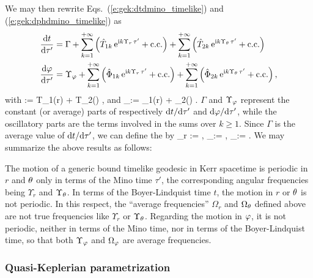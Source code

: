 We may then rewrite Eqs.~(\ref{e:gek:dtdmino_timelike}) and (\ref{e:gek:dphdmino_timelike})
as
\begin{subequations}
\begin{align}
 & \frac{\mathrm{d} t}{\mathrm{d} \tau'} = \Gamma + \sum_{k=1}^{+\infty} \left( \hat{T}_{1k} \, \mathrm{e}^{\mathrm{i} k \Upsilon_r \, \tau'} + \mathrm{c.c.} \right)
    + \sum_{k=1}^{+\infty} \left( \hat{T}_{2k} \, \mathrm{e}^{\mathrm{i} k \Upsilon_\theta \, \tau'} + \mathrm{c.c.} \right) \\
 & \frac{\mathrm{d} \varphi}{\mathrm{d} \tau'} = \Upsilon_\varphi + \sum_{k=1}^{+\infty} \left( \hat{\Phi}_{1k} \, \mathrm{e}^{\mathrm{i} k \Upsilon_r \, \tau'} + \mathrm{c.c.} \right)
 + \sum_{k=1}^{+\infty} \left( \hat{\Phi}_{2k} \, \mathrm{e}^{\mathrm{i} k \Upsilon_\theta \, \tau'} + \mathrm{c.c.} \right) ,
\end{align}
\end{subequations}
with
\be
    \Gamma := \langle T_1(r) \rangle + \langle T_2(\th) \rangle ,
\ee
and
\be
    \Upsilon_\ph :=  \langle \Phi_1(r) \rangle + \langle \Phi_2(\th) \rangle .
\ee
$\Gamma$ and $\Upsilon_\varphi$ represent the constant (or average) parts of
respectively $\mathrm{d} t/\mathrm{d}\tau'$ and $\mathrm{d} \varphi / \mathrm{d}\tau'$, while the oscillatory parts
are the terms involved in the sums over $k\geq 1$.
Since $\Gamma$ is the average value of $\mathrm{d} t/\mathrm{d}\tau'$,
we can define the
by \cite{DrascH04,FujitH09}
\be
    \Omega_r := ,\qquad
    \Omega_\th := \frac{\Upsilon_\th}{\Gamma}, \qquad
    \Omega_\ph := \frac{\Upsilon_\ph}{\Gamma} .
\ee
We may summarize the above results as follows:
\begin{prop}
The motion of a generic bound timelike
geodesic in Kerr spacetime is periodic in $r$ and $\theta$
only in terms of the Mino time $\tau'$, the corresponding angular frequencies
being $\Upsilon_r$ and $\Upsilon_\theta$. In terms of the Boyer-Lindquist time
$t$, the motion in $r$ or $\theta$ is not periodic. In this respect, the ``average
frequencies'' $\Omega_r$ and $\Omega_\theta$ defined above are not true
frequencies like $\Upsilon_r$ or $\Upsilon_\theta$.
Regarding the motion in $\varphi$,
it is not periodic, neither in terms of the Mino time, nor in terms
of the Boyer-Lindquist time, so that both $\Upsilon_\varphi$ and $\Omega_\varphi$
are average frequencies.
\end{prop}

\subsubsection{Quasi-Keplerian parametrization}

